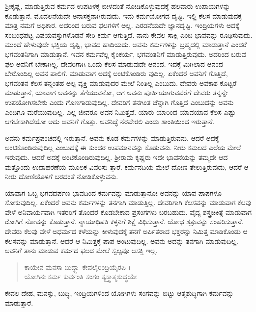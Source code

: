 ಶ್ರೀಕೃಷ್ಣ, ಮಾಡುತ್ತಿರುವ ಕರ್ಮದ ಉಪಟಳಕ್ಕೆ ಬೀಳದಂತೆ ನೋಡಿಕೊಳ್ಳುವುದಕ್ಕೆ ಹಲವಾರು ಉಪಾಯಗಳನ್ನು ಕೊಡುತ್ತಾನೆ. ಮೊದಲನೆಯದೇ ಅನಾಸಕ್ತನಾಗಿರುವುದು. ಇದು ಕರ್ಮಯೋಗದ ದೃಷ್ಟಿ. ಇಲ್ಲಿ ಕೆಲಸ ಮಾಡುವುದಕ್ಕೆ ಮಾತ್ರ ನಮಗೆ ಅಧಿಕಾರ. ಅದರಿಂದ ಬರುವ ಫಲಗಳಿಗೆ ಅಲ್ಲ. ಎರಡನೆಯದೇ ಜ್ಞಾನದೃಷ್ಟಿ. ಇಂದ್ರಿಯಗಳು ಅದಕ್ಕೆ ಸಂಬಂಧಪಟ್ಟ ವಿಷಯವಸ್ತುಗಳೊಡನೆ ಸೇರಿ ಕರ್ಮ ಆಗುತ್ತಿದೆ. ನಾನು ಕೇವಲ ಸಾಕ್ಷಿ ಎಂಬ ಭಾವವನ್ನು ರೂಢಿಸುವುದು. ಮುಂದೆ ಹೇಳುವುದೇ ಭಕ್ತಿಯ ದೃಷ್ಟಿ, ಭಾವದ ಹಾದಿಯದು. ಅವನು ಕರ್ಮಗಳನ್ನು ಬ್ರಹ್ಮದಲ್ಲಿ ಮಾಡುತ್ತಾನೆ ಎಂದರೆ ಭಗವಂತನಿಗಾಗಿ ಮಾಡುತ್ತಾನೆ. ಇವನ ಕರ್ಮವೆಲ್ಲ ಕೈಂಕರ್ಯ, ಭಗವಂತನಿಗೆ ಮಾಡುತ್ತಿರುವುದು. ಅದರಿಂದ ಬರುವ ಫಲ ಅವನಿಗೆ ಬೇಕಾಗಿಲ್ಲ. ದೇವರಿಗಾಗಿ ಒಂದು ಕೆಲಸ ಮಾಡುವುದೇ ಆನಂದ. ಇದಕ್ಕೆ ಮಿಗಿಲಾದ ಆನಂದ ಬೇರೊಂದಿಲ್ಲ ಅವನ ಪಾಲಿಗೆ. ಮಾಡುವಾಗ ಅದಕ್ಕೆ ಅಂಟಿಕೊಂಡಿರು ವುದಿಲ್ಲ. ಏಕೆಂದರೆ ಅವನಿಗೆ ಗೊತ್ತಿದೆ, ಭಗವಂತನ ಕೆಲಸ ತನ್ನಂತಹ ಅಲ್ಪ ವ್ಯಕ್ತಿ ಮಾಡುವುದರ ಮೇಲೆ ನಿಂತಿಲ್ಲ ಎಂಬುದು. ದೇವರು ಅವಕಾಶ ಕೊಟ್ಟರೆ ಮಾಡುತ್ತಾನೆ, ಯಾವಾಗ ಅವನನ್ನು ತೆಗೆಯುವನೋ, ಆಗ ಅವನು ಪೂರ್ತಿಯಾಗುವವರೆಗೆ ದೇವರು ತನ್ನನ್ನೇ ಉಪಯೋಗಿಸಬೇಕು ಎಂದು ಗೊಣಗಾಡುವುದಿಲ್ಲ. ದೇವರಿಗೆ ತನಗಿಂತ ಚೆನ್ನಾಗಿ ಗೊತ್ತಿದೆ ಎಂಬುದನ್ನು ಅವನು ಎಂದಿಗೂ ಮರೆಯುವುದಿಲ್ಲ. ಎಲ್ಲ ಜೀವರೂ ಅವನ ನಿಮಿತ್ತವೆ. ಯಾರು ಯಾರಿಂದ ಯಾವಯಾವ ಕೆಲಸ ಎಷ್ಟು ಆಗಬೇಕಾಗಿದೆಯೋ ಅದು ಅವನಿಗೆ ಗೊತ್ತು. ಅವನಿಚ್ಛೆ ನೆರವೇರಲಿ ಎಂದು ಶಾಂತಿಯಿಂದ ಇರುತ್ತಾನೆ.

ಅವನು ಕರ್ಮಪ್ರಪಂಚದಲ್ಲಿ ಇರುತ್ತಾನೆ. ಅವನು ಕೂಡ ಕರ್ಮಗಳನ್ನು ಮಾಡುತ್ತಿರುವನು. ಆದರೆ ಅದಕ್ಕೆ ಅಂಟಿಕೊಂಡಿರುವುದಿಲ್ಲ ಎಂಬುದಕ್ಕೆ ಈ ಸುಂದರ ಉಪಮಾನವನ್ನು ಕೊಡುವನು. ನೀರು ಕಮಲದ ಎಲೆಯ ಮೇಲೆ ಇರುವುದು. ಆದರೆ ಅದಕ್ಕೆ ಅಂಟಿಕೊಂಡಿರುವುದಿಲ್ಲ. ಶ್ರೀರಾಮ ಕೃಷ್ಣರು ಇದೇ ಭಾವನೆಯನ್ನು ತಮ್ಮದೇ ಆದ ಮತ್ತೊಂದು ಉದಾಹರಣೆಯ ಮೂಲಕ ವಿವರಿಸು ತ್ತಾರೆ. ಕರ್ಮನದಿಯ ಮೇಲೆ ದೋಣಿ ತೇಲುತ್ತಿರುವುದು, ಆದರೆ ಆ ನೀರು ದೋಣಿಯೊಳಗೆ ಬರದಂತೆ ನೋಡಿಕೊಳ್ಳುವನು.

ಯಾವಾಗ ಒಬ್ಬ ಭಗವದರ್ಪಣ ಭಾವದಿಂದ ಕರ್ಮವನ್ನು ಮಾಡುತ್ತಾನೋ ಅವನನ್ನು ಯಾವ ಪಾಪಗಳೂ ಸೋಕುವುದಿಲ್ಲ. ಏಕೆಂದರೆ ಅವನು ಕರ್ಮಗಳನ್ನು ತನಗಾಗಿ ಮಾಡುತ್ತಿಲ್ಲ. ದೇವರಿಗಾಗಿ ಕೆಲಸವನ್ನು ಮಾಡುವಾಗ ಕೆಲವು ವೇಳೆ ಅನಿವಾರ್ಯವಾಗಿ ಇತರರಿಗೆ ತೊಂದರೆ ಕೊಡಬೇಕಾದ ಪ್ರಸಂಗಗಳು ಬರಬಹುದು. ವೈದ್ಯ ಶಸ್ತ್ರಚಿಕಿತ್ಸೆ ಮಾಡುವಾಗ ರೋಗಿಗೆ ನೋವನ್ನು ಕೊಡುತ್ತಾನೆ. ನ್ಯಾಯಾಧಿಪತಿ ಕಳ್ಳನಿಗೆ ಶಿಕ್ಷೆ ವಿಧಿಸುತ್ತಾನೆ. ಯೋಧ ಶತ್ರುವನ್ನು ಸಂಹರಿಸುತ್ತಾನೆ. ದೇವರು ಕೆಲವು ವೇಳೆ ಅಧರ್ಮದ ಕಳೆಯನ್ನು ಕೀಳುವುದಕ್ಕೆ ತನಗೆ ಅರ್ಪಿತರಾದ ಭಕ್ತರನ್ನು ನಿಮಿತ್ತ ಮಾಡಿಕೊಂಡು ಆ ಕೆಲಸವನ್ನು ಮಾಡುತ್ತಾನೆ. ಆದರೆ ಆ ನಿಮಿತ್ತಕ್ಕೆ ಪಾಪ ಅಂಟುವುದಿಲ್ಲ. ಅವನು ಅದನ್ನು ತನಗಾಗಿ ಮಾಡುವುದಿಲ್ಲ. ಅವನಿಗೆ ತಾನು ಮಾಡುವ ಕರ್ಮದ ಫಲದ ಮೇಲೆ ಸ್ವಲ್ಪವೂ ಆಸಕ್ತಿ ಇಲ್ಲ.

\begin{verse}
ಕಾಯೇನ ಮನಸಾ ಬುದ್ಧ್ಯಾ ಕೇವಲೈರಿಂದ್ರಿಯೈರಪಿ ।\\ಯೋಗಿನಃ ಕರ್ಮ ಕುರ್ವಂತಿ ಸಂಗಂ ತ್ಯಕ್ತ್ವಾತ್ಮಶುದ್ಧಯೇ 
\end{verse}

{\small ಕೇವಲ ದೇಹ, ಮನಸ್ಸು, ಬುದ್ಧಿ, ಇಂದ್ರಿಯಗಳಿಂದ ಯೋಗಿಗಳು ಸಂಗವನ್ನು ಬಿಟ್ಟು ಆತ್ಮಶುದ್ಧಿಗಾಗಿ ಕರ್ಮವನ್ನು ಮಾಡುತ್ತಾರೆ.}


